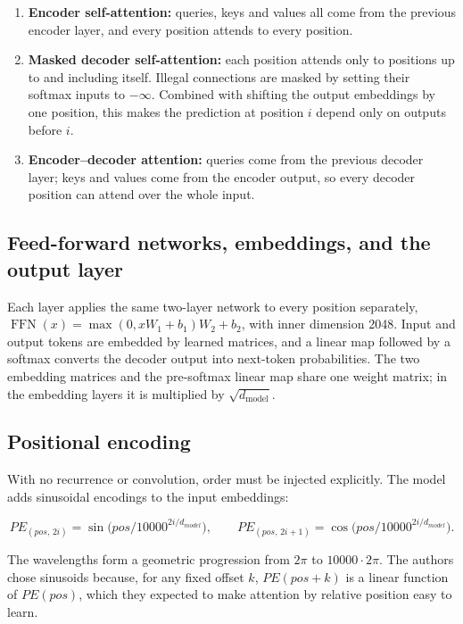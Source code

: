 \begin{enumerate}
\def\labelenumi{\arabic{enumi}.}
\tightlist
\item
  \textbf{Encoder self-attention:} queries, keys and values all come
  from the previous encoder layer, and every position attends to every
  position.
\item
  \textbf{Masked decoder self-attention:} each position attends only to
  positions up to and including itself. Illegal connections are masked
  by setting their softmax inputs to \(-\infty\). Combined with shifting the
  output embeddings by one position, this makes the prediction at
  position \(i\) depend only on outputs before \(i\).
\item
  \textbf{Encoder--decoder attention:} queries come from the previous
  decoder layer; keys and values come from the encoder output, so every
  decoder position can attend over the whole input.
\end{enumerate}

\subsection{Feed-forward networks, embeddings, and the output
layer}\label{sec:math:II5}

Each layer applies the same two-layer network to every position
separately, \(\operatorname{FFN}(x) = \max(0, xW_{1} + b_{1})W_{2} +
b_{2}\), with inner dimension 2048. Input and output tokens are
embedded by learned matrices, and a linear map followed by a softmax
converts the decoder output into next-token probabilities. The two
embedding matrices and the pre-softmax linear map share one weight
matrix; in the embedding layers it is multiplied by \(\sqrt{d_{\text{model}}}\).

\subsection{Positional encoding}\label{sec:math:II6}

With no recurrence or convolution, order must be injected explicitly.
The model adds sinusoidal encodings to the input embeddings:

\[
PE_{(pos,\,2i)} = \sin\!\big(pos / 10000^{2i/d_{model}}\big), \qquad PE_{(pos,\,2i+1)} = \cos\!\big(pos / 10000^{2i/d_{model}}\big).
\]

The wavelengths form a geometric progression from \(2\pi\) to \(10000\cdot 2\pi\). The
authors chose sinusoids because, for any fixed offset \(k\), \(PE(pos + k)\) is
a linear function of \(PE(pos)\), which they expected to make attention by
relative position easy to learn.

